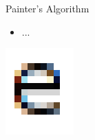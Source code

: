 \documentclass{lug}
\newcommand{\splitslide}[4]{
    \noindent
    \begin{minipage}{#1 \textwidth - #2 }
        #3
    \end{minipage}%
    \hspace{ \dimexpr #2 * 2 \relax }%
    \begin{minipage}{\textwidth - #1 \textwidth - #2 }
        #4
    \end{minipage}
}
\begin{document}
\begin{frame}{Painter's Algorithm}
    \splitslide{0.65}{.7em}{
        \small
        \begin{itemize}
            \item ...
        \end{itemize}
    }{
        \includegraphics[width=\textwidth]{graphics/subpixel_e}
    }
\end{frame}
\end{document}
